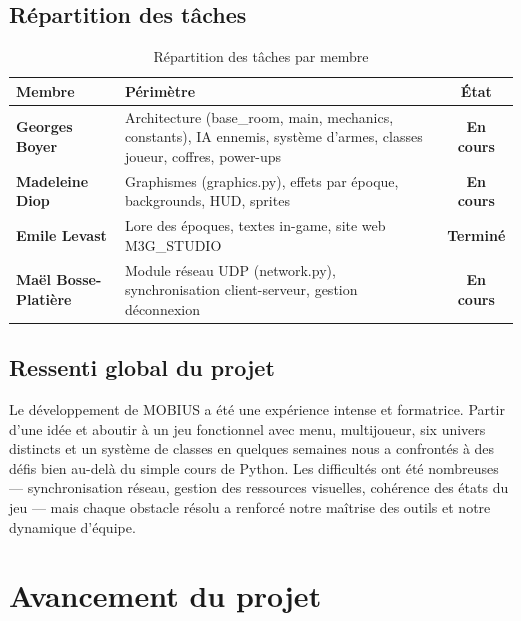 \documentclass[12pt,a4paper]{article}
\begin{document}
\subsection{Répartition des tâches}

\begin{table}[H]
\centering
\caption{Répartition des tâches par membre}
\renewcommand{\arraystretch}{1.4}
\begin{tabularx}{\textwidth}{@{}>{\bfseries}lXc@{}}
\toprule
\rowcolor{tableheadbg}
\textbf{Membre} & \textbf{Périmètre} & \textbf{État} \\
\midrule
Georges Boyer       & Architecture (base\_room, main, mechanics, constants), IA ennemis, système d'armes, classes joueur, coffres, power-ups & \textcolor{warnorange}{\textbf{En cours}} \\
\rowcolor{rowaltbg}
Madeleine Diop      & Graphismes (graphics.py), effets par époque, backgrounds, HUD, sprites & \textcolor{warnorange}{\textbf{En cours}} \\
Emile Levast        & Lore des époques, textes in-game, site web M3G\_STUDIO & \textcolor{okgreen}{\textbf{Terminé}} \\
\rowcolor{rowaltbg}
Maël Bosse-Platière & Module réseau UDP (network.py), synchronisation client-serveur, gestion déconnexion & \textcolor{warnorange}{\textbf{En cours}} \\
\bottomrule
\end{tabularx}
\end{table}

\subsection{Ressenti global du projet}

Le développement de MOBIUS a été une expérience intense et formatrice. Partir d'une idée et aboutir à un jeu fonctionnel avec menu, multijoueur, six univers distincts et un système de classes en quelques semaines nous a confrontés à des défis bien au-delà du simple cours de Python. Les difficultés ont été nombreuses --- synchronisation réseau, gestion des ressources visuelles, cohérence des états du jeu --- mais chaque obstacle résolu a renforcé notre maîtrise des outils et notre dynamique d'équipe.

\newpage
\section{Avancement du projet}
\end{document}

